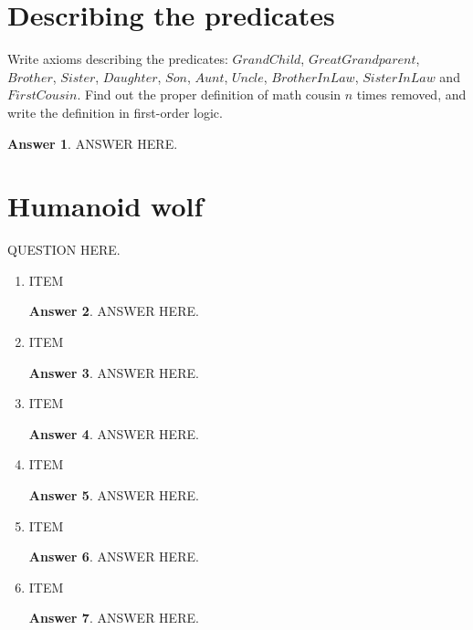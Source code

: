 \documentclass[a4paper]{article}
\renewcommand{\(}{\left(}
\renewcommand{\)}{\right)}
\theoremstyle{plain}
\theoremstyle{plain}
\theoremstyle{definition}
\newtheorem*{answer}{Answer}
\begin{document}
\section{Describing the predicates}
Write axioms describing the predicates: $GrandChild$, $GreatGrandparent$, $Brother$, $Sister$, $Daughter$, $Son$, $Aunt$, $Uncle$, $BrotherInLaw$, $SisterInLaw$ and $FirstCousin$. Find out the proper definition of math cousin $n$ times removed, and write the definition in first-order logic.
\begin{shaded}
\begin{answer}
ANSWER HERE.
\end{answer}
\end{shaded}

\section{Humanoid wolf }
QUESTION HERE.
\begin{enumerate}[label*=\roman*.,ref=\roman*]

\item ITEM
\begin{shaded}
\begin{answer}
ANSWER HERE.
\end{answer}
\end{shaded}

\item ITEM
\begin{shaded}
\begin{answer}
ANSWER HERE.
\end{answer}
\end{shaded}

\item ITEM
\begin{shaded}
\begin{answer}
ANSWER HERE.
\end{answer}
\end{shaded}

\item ITEM
\begin{shaded}
\begin{answer}
ANSWER HERE.
\end{answer}
\end{shaded}

\item ITEM
\begin{shaded}
\begin{answer}
ANSWER HERE.
\end{answer}
\end{shaded}

\item ITEM
\begin{shaded}
\begin{answer}
ANSWER HERE.
\end{answer}
\end{shaded}

\end{enumerate}
\end{document}
